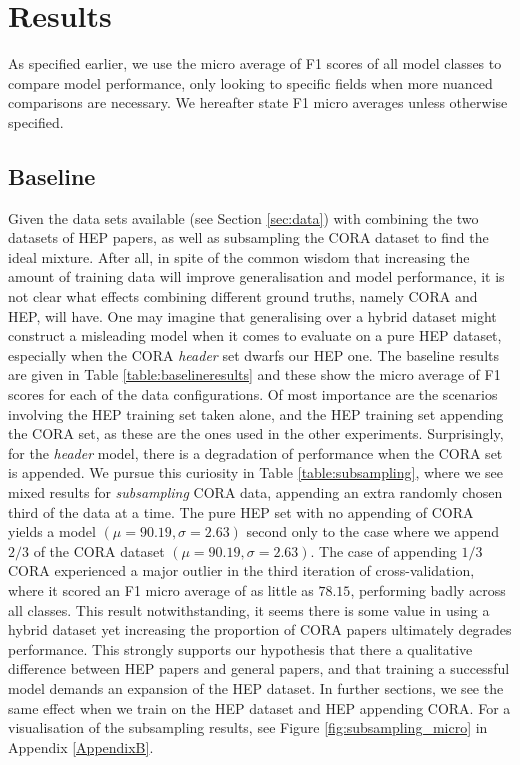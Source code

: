 \section{Results}
\label{sec:results}

As specified earlier, we use the micro average of F1 scores of all model classes to compare model performance, only looking to specific fields when more nuanced comparisons are necessary. We hereafter state F1 micro averages unless otherwise specified.

\subsection{Baseline}
\label{subsec:baslineresults}

Given the data sets available (see Section \ref{sec:data}) with combining the two datasets of HEP papers, as well as subsampling the CORA dataset to find the ideal mixture. After all, in spite of the common wisdom that increasing the amount of training data will improve generalisation and model performance, it is not clear what effects combining different ground truths, namely CORA and HEP, will have. One may imagine that generalising over a hybrid dataset might construct a misleading model when it comes to evaluate on a pure HEP dataset, especially when the CORA \emph{header} set dwarfs our HEP one. The baseline results are given in Table \ref{table:baselineresults} and these show the micro average of F1 scores for each of the data configurations. Of most importance are the scenarios involving the HEP training set taken alone, and the HEP training set appending the CORA set, as these are the ones used in the other experiments. Surprisingly, for the \emph{header} model, there is a degradation of performance when the CORA set is appended. We pursue this curiosity in Table \ref{table:subsampling}, where we see mixed results for \emph{subsampling} CORA data, appending an extra randomly chosen third of the data at a time. The pure HEP set with no appending of CORA yields a model $(\mu = 90.19, \sigma = 2.63)$ second only to the case where we append $2/3$ of the CORA dataset $(\mu = 90.19, \sigma = 2.63)$. The case of appending $1/3$ CORA experienced a major outlier in the third iteration of cross-validation, where it scored an F1 micro average of as little as $78.15$, performing badly across all classes. This result notwithstanding, it seems there is some value in using a hybrid dataset yet increasing the proportion of CORA papers ultimately degrades performance. This strongly supports our hypothesis that there a qualitative difference between HEP papers and general papers, and that training a successful model demands an expansion of the HEP dataset. In further sections, we see the same effect when we train on the HEP dataset and HEP appending CORA. For a visualisation of the subsampling results, see Figure \ref{fig:subsampling_micro} in Appendix \ref{AppendixB}.

